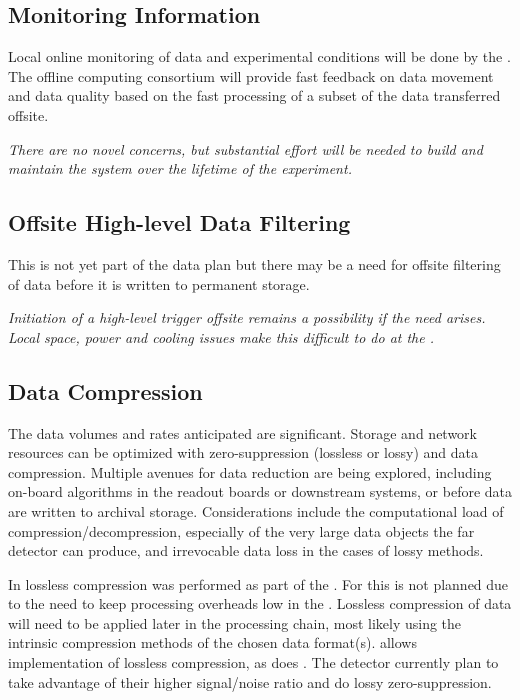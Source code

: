 \documentclass[../main-v1.tex]{subfiles}
\begin{document}
\subsection{Monitoring Information} 
Local online monitoring of data and experimental conditions will be done by the . %
The offline computing consortium will provide fast feedback on data movement and data quality based on the fast processing of a subset of the data transferred offsite. %

{\it There are no novel concerns, but substantial effort will be needed to build and maintain the system over the lifetime of the experiment.}


\subsection{Offsite High-level Data Filtering}

This is not yet part of the data plan but there may be a need for offsite filtering of data before %
it is written to permanent storage. 

{\it  Initiation of a high-level trigger offsite remains a possibility if the need arises. Local space, power and cooling issues make this difficult to do at the .}

\subsection{Data Compression}
The data volumes and rates anticipated are significant. Storage and network resources can be optimized with zero-suppression (lossless or lossy) and data compression. Multiple avenues for data reduction are being explored, including on-board algorithms in the readout boards or downstream  systems, or before data are written to archival storage.  Considerations include the computational load of compression/decompression, especially of the very large data objects the far detector can produce, and irrevocable data loss in the cases of lossy methods.

In  lossless compression was performed as part of the . For  this is not planned due to the need to keep processing overheads low in the . Lossless compression of   data will need to be applied later in the processing chain, most likely using the intrinsic compression methods of the chosen data format(s).   allows implementation of lossless compression, as does .  The  detector currently plan to take advantage of their higher signal/noise ratio and do lossy zero-suppression. 
\end{document}
